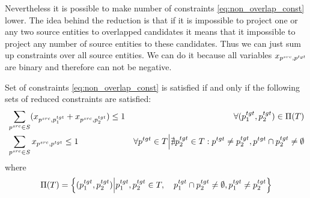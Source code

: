 Nevertheless it is possible to make number of constraints \eqref{eq:non_overlap_const} lower.
The idea behind the reduction is that if it is impossible to project one or any two source entities to
overlapped candidates it means that it impossible to project any number of source entities to these candidates.
Thus we can just sum up constraints over all source entities.
We can do it because all variables \( x_{p^{src}, p^{tgt}} \) are binary and therefore
can not be negative.
\begin{theorem}
    Set of constraints \eqref{eq:non_overlap_const} is satisfied if and only if
    the following sets of reduced constraints are satisfied:
    \begin{align*}
         & \sum\limits_{p^{src} \in S} (x_{p^{src}, p_1^{tgt}} + x_{p^{src}, p_2^{tgt}}) \leq 1                                & \forall (p_1^{tgt}, p_2^{tgt}) \in \Pi(T) \\
         & \sum\limits_{p^{src} \in S} x_{p^{src}, p^{tgt}} \leq 1
         & \forall p^{tgt} \in T \Big| \nexists p_2^{tgt} \in T: p^{tgt} \neq p_2^{tgt}, p^{tgt} \cap p_2^{tgt} \neq \emptyset                                             \\
    \end{align*}
    where
    \begin{equation*}
        \Pi(T) = \left\{ (p_1^{tgt}, p_2^{tgt}) \Big| p_1^{tgt}, p_2^{tgt} \in T,
        \quad p_1^{tgt} \cap p_2^{tgt} \neq \emptyset,
        p_1^{tgt} \neq p_2^{tgt} \right\}
    \end{equation*}
\end{theorem}
